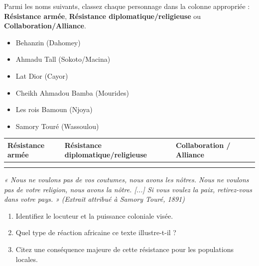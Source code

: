 \documentclass[11pt]{article}
\begin{document}
\begin{exercice}
Parmi les noms suivants, classez chaque personnage dans la colonne appropriée : \textbf{Résistance armée}, \textbf{Résistance diplomatique/religieuse} ou \textbf{Collaboration/Alliance}.

\begin{itemize}
    \item Behanzin (Dahomey) \quad \item Ahmadu Tall (Sokoto/Macina) \quad \item Lat Dior (Cayor)
    \item Cheikh Ahmadou Bamba (Mourides) \quad \item Les rois Bamoun (Njoya) \quad \item Samory Touré (Wassoulou)
\end{itemize}

\begin{tabularx}{\linewidth}{@{} >{\bfseries}l X X X @{}}
\toprule
Résistance armée & Résistance diplomatique/religieuse & Collaboration / Alliance \\
\midrule
\dotfill & \dotfill & \dotfill \\
\dotfill & \dotfill & \dotfill \\
\bottomrule
\end{tabularx}
\end{exercice}

\begin{exercice}
\textit{« Nous ne voulons pas de vos coutumes, nous avons les nôtres. Nous ne voulons pas de votre religion, nous avons la nôtre. [...] Si vous voulez la paix, retirez-vous dans votre pays. »}
\textit{(Extrait attribué à Samory Touré, 1891)}

\begin{enumerate}
    \item Identifiez le locuteur et la puissance coloniale visée.
    \item Quel type de réaction africaine ce texte illustre-t-il ?
    \item Citez une conséquence majeure de cette résistance pour les populations locales.
\end{enumerate}
\end{exercice}
\end{document}
